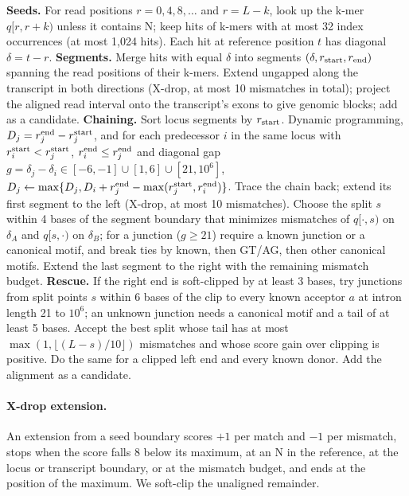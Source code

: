 \documentclass[11pt]{article}
\begin{document}
\begin{algorithm}[ht]
\caption{Alignment candidates of one read orientation $q$ of length $L$.}
\label{alg:align}
\begin{algorithmic}[1]
\State \textbf{Seeds.} For read positions $r=0,4,8,\ldots$ and $r=L-k$, look up the k-mer $q[r,r+k)$ unless it contains N; keep hits of k-mers with at most 32 index occurrences (at most 1{,}024 hits). Each hit at reference position $t$ has diagonal $\delta=t-r$.
\State \textbf{Segments.} Merge hits with equal $\delta$ into segments $(\delta,r_{\rm start},r_{\rm end})$ spanning the read positions of their k-mers.
  \State Extend ungapped along the transcript in both directions (X-drop, at most 10 mismatches in total); project the aligned read interval onto the transcript's exons to give genomic blocks; add as a candidate.
\EndFor
\State \textbf{Chaining.} Sort locus segments by $r_{\rm start}$. Dynamic programming, $D_j=r^{\rm end}_j-r^{\rm start}_j$, and for each predecessor $i$ in the same locus with $r^{\rm start}_i<r^{\rm start}_j$, $r^{\rm end}_i\le r^{\rm end}_j$ and diagonal gap $g=\delta_j-\delta_i\in[-6,-1]\cup[1,6]\cup[21,10^6]$, $D_j\gets\max\{D_j,D_i+r^{\rm end}_j-\max(r^{\rm start}_j,r^{\rm end}_i)\}$.
  \State Trace the chain back; extend its first segment to the left (X-drop, at most 10 mismatches).
    \State Choose the split $s$ within 4 bases of the segment boundary that minimizes mismatches of $q[\cdot,s)$ on $\delta_A$ and $q[s,\cdot)$ on $\delta_B$; for a junction ($g\ge21$) require a known junction or a canonical motif, and break ties by known, then GT/AG, then other canonical motifs.
  \EndFor
  \State Extend the last segment to the right with the remaining mismatch budget.
  \State \textbf{Rescue.} If the right end is soft-clipped by at least 3 bases, try junctions from split points $s$ within 6 bases of the clip to every known acceptor $a$ at intron length 21 to $10^6$; an unknown junction needs a canonical motif and a tail of at least 5 bases. Accept the best split whose tail has at most $\max(1,\lfloor (L-s)/10\rfloor)$ mismatches and whose score gain over clipping is positive. Do the same for a clipped left end and every known donor.
  \State Add the alignment as a candidate.
\EndFor
\end{algorithmic}
\end{algorithm}

\paragraph{X-drop extension.} An extension from a seed boundary scores $+1$ per match and $-1$ per mismatch, stops when the score falls 8 below its maximum, at an N in the reference, at the locus or transcript boundary, or at the mismatch budget, and ends at the position of the maximum. We soft-clip the unaligned remainder.
\end{document}
